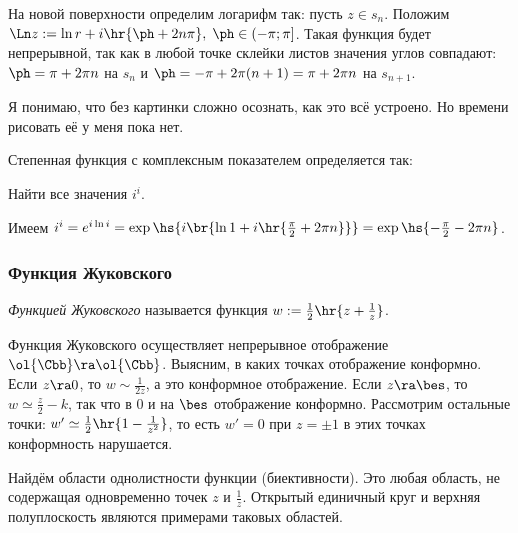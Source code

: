 \documentclass[a4paper]{article}
\begin{document}
\begin{solution}
На новой поверхности определим логарифм так: пусть $z \in s_n$. Положим
$\Ln z := \ln r + i\hr{\ph + 2n\pi}, \; \ph \in (-\pi; \pi]$. Такая функция будет непрерывной, так как
в любой точке склейки листов значения углов совпадают: $\ph = \pi + 2\pi n$ на $s_n$ и $\ph = - \pi + 2\pi(n + 1) = \pi+ 2\pi n$ на $s_{n+1}$.

\begin{petit}
Я понимаю, что без картинки сложно осознать, как это всё устроено. Но времени рисовать её у меня пока нет.
\end{petit}

\begin{df}
Степенная функция с комплексным показателем определяется так:
\end{df}

\begin{problem}
Найти все значения $i^i$.
\end{problem}
\begin{solution}
Имеем
$i^i = e^{i\ln i} = \exp\hs{i\br{\ln 1 + i\hr{\frac{\pi }{2} + 2\pi n}}} = \exp\hs{-\frac{\pi}{2}-2\pi n}$.
\end{solution}

\subsubsection{Функция Жуковского}

\begin{df}
\emph{Функцией Жуковского} называется функция $w := \frac{1}{2}\hr{z + \frac{1}{z}}$.
\end{df}

Функция Жуковского осуществляет непрерывное отображение $\ol{\Cbb} \ra \ol{\Cbb}$.
Выясним, в каких точках отображение конформно. Если $z \ra 0$, то $w \sim \frac{1}{2z}$, а это конформное отображение.
Если $z \ra \bes$, то $w \simeq \frac{z}{2} - k$, так что в $0$ и на $\bes$ отображение конформно. Рассмотрим
остальные точки: $w' \simeq \frac{1}{2}\hr{1 - \frac{1}{z^2}}$, то есть $w' = 0$ при $z = \pm 1$ в этих точках конформность
нарушается.

Найдём области однолистности функции (биективности). Это любая область, не содержащая одновременно
точек $z$ и $\frac{1}{z}$. Открытый единичный круг и верхняя полуплоскость являются примерами таковых областей.


\end{solution}
\end{document}
